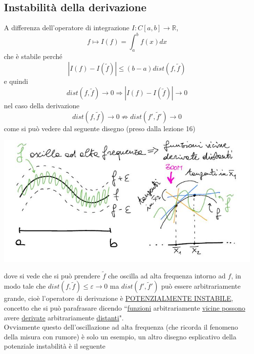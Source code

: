 \documentclass[12pt,a4paper]{article}
\begin{document}
\subsection{Instabilità della derivazione}
A differenza dell'operatore di integrazione $I:C[a,b]\rightarrow\mathbb{R}$,
\begin{equation*}
    f\longmapsto I(f)=\int_a^b f(x)dx
\end{equation*}
che è stabile perché
\begin{equation*}
    |I(f)-I(\tilde{f})|\leq(b-a)dist(f,\tilde{f})
\end{equation*}
e quindi 
\begin{equation*}
    dist(f,\tilde{f})\rightarrow0\Rightarrow|I(f)-I(\tilde{f})|\rightarrow0
\end{equation*}
nel caso della derivazione
\begin{equation*}
    dist(f,\tilde{f})\rightarrow0\nRightarrow dist(f',\tilde{f}')\rightarrow0
\end{equation*}
come si può vedere dal seguente disegno (preso dalla lezione 16)
\begin{center}
    \includegraphics[scale=0.6]{calcolo55.JPG}
\end{center}
dove si vede che si può prendere $\tilde{f}$ che oscilla ad alta frequenza intorno ad $f$, in modo tale che $dist(f,\tilde{f})\leq\varepsilon\rightarrow0$ ma $dist(f',\tilde{f}')$ può essere arbitrariamente grande, cioè l'operatore di derivazione è \uline{POTENZIALMENTE INSTABILE}, concetto che si può parafrasare dicendo ``\uline{funzioni} arbitrariamente \uline{vicine possono} avere \uline{derivate} arbitrariamente \uline{distanti}".\\Ovviamente questo dell'oscillazione ad alta frequenza (che ricorda il fenomeno della misura con rumore) è solo un esempio, un altro disegno esplicativo della potenziale instabilità è il seguente 
\end{document}
